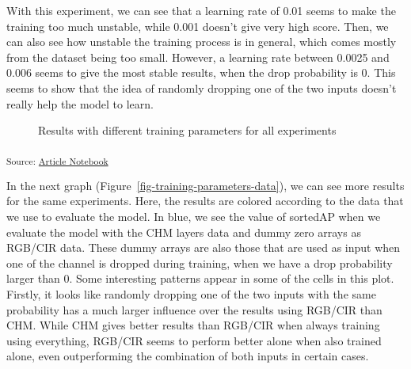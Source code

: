 \documentclass[
  letterpaper,
  DIV=11,
  numbers=noendperiod]{scrartcl}
\begin{document}
With this experiment, we can see that a learning rate of 0.01 seems to
make the training too much unstable, while 0.001 doesn't give very high
score. Then, we can also see how unstable the training process is in
general, which comes mostly from the dataset being too small. However, a
learning rate between 0.0025 and 0.006 seems to give the most stable
results, when the drop probability is 0. This seems to show that the
idea of randomly dropping one of the two inputs doesn't really help the
model to learn.

\begin{figure}[H]


\caption{\label{fig-training-parameters-experiments}Results with
different training parameters for all experiments}

\end{figure}%

\textsubscript{Source:
\href{https://ZokszY.github.io/Geodan-internship-report/index-preview.html}{Article
Notebook}}

In the next graph (Figure~\ref{fig-training-parameters-data}), we can
see more results for the same experiments. Here, the results are colored
according to the data that we use to evaluate the model. In blue, we see
the value of sortedAP when we evaluate the model with the CHM layers
data and dummy zero arrays as RGB/CIR data. These dummy arrays are also
those that are used as input when one of the channel is dropped during
training, when we have a drop probability larger than 0. Some
interesting patterns appear in some of the cells in this plot. Firstly,
it looks like randomly dropping one of the two inputs with the same
probability has a much larger influence over the results using RGB/CIR
than CHM. While CHM gives better results than RGB/CIR when always
training using everything, RGB/CIR seems to perform better alone when
also trained alone, even outperforming the combination of both inputs in
certain cases.
\end{document}
